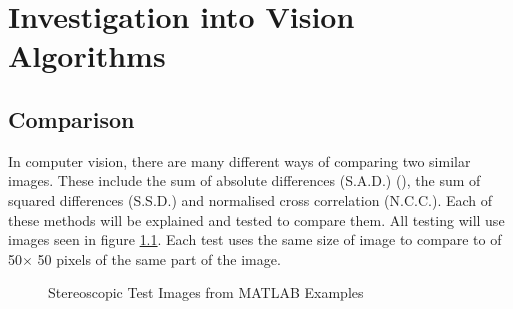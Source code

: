 \chapter{Investigation into Vision Algorithms} \label{Chapter:InvestigationVision}

\section{Comparison}
In computer vision, there are many different ways of comparing two similar images. These include the sum of absolute differences (S.A.D.) (\cite{Hamzah:DistanceDetection}), the sum of squared differences (S.S.D.)\cite{Mrovlje:Distance_Stereoscopic} and  normalised cross correlation (N.C.C.)\cite{zhao2006image}. Each of these methods will be explained and tested to compare them. All testing will use images seen in figure \ref{fig:StereoTest}. Each test uses the same size of image to compare to of 50$\times$ 50 pixels of the same part of the image. 

\begin{figure}
\centering
{}
\caption{Stereoscopic Test Images from MATLAB Examples}
\label{fig:StereoTest}
\end{figure}


